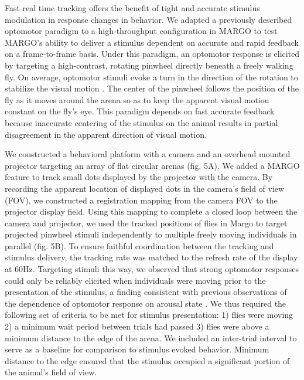 \documentclass[10pt]{article}
\begin{document}
\begin{multicols}{2}
Fast real time tracking offers the benefit of tight and accurate stimulus modulation in response changes in behavior. We adapted a previously described optomotor paradigm to a high-throughput configuration in MARGO \cite{Fujiwara_A_2017} to test MARGO's ability to deliver a stimulus dependent on accurate and rapid feedback on a frame-to-frame basis. Under this paradigm, an optomotor response is elicited by targeting a high-contrast, rotating pinwheel directly beneath a freely walking fly. On average, optomotor stimuli evoke a turn in the direction of the rotation to stabilize the visual motion \cite{Gtz_Visual_1973}. The center of the pinwheel follows the position of the fly as it moves around the arena so as to keep the apparent visual motion constant on the fly's eye. This paradigm depends on fast accurate feedback because inaccurate centering of the stimulus on the animal results in partial disagreement in the apparent direction of visual motion.

We constructed a behavioral platform with a camera and an overhead mounted projector targeting an array of flat circular arenas (fig. 5A). We added a MARGO feature to track small dots displayed by the projector with the camera. By recording the apparent location of displayed dots in the camera's field of view (FOV), we constructed a registration mapping from the camera FOV to the projector display field. Using this mapping to complete a closed loop between the camera and projector, we used the tracked positions of flies in Margo to target projected pinwheel stimuli independently to multiple freely moving individuals in parallel (fig. 5B). To ensure faithful coordination between the tracking and stimulus delivery, the tracking rate was matched to the refresh rate of the display at 60Hz. Targeting stimuli this way, we observed that strong optomotor responses could only be reliably elicited when individuals were moving prior to the presentation of the stimulus, a finding consistent with previous observations of the dependence of optomotor response on arousal state \cite{Zhu_Peripheral_2009,Kim_Fly_2016}. We thus required the following set of criteria to be met for stimulus presentation: 1) flies were moving 2) a minimum wait period between trials had passed 3) flies were above a minimum distance to the edge of the arena. We included an inter-trial interval to serve as a baseline for comparison to stimulus evoked behavior. Minimum distance to the edge ensured that the stimulus occupied a significant portion of the animal's field of view. 


\end{multicols}
\end{document}
